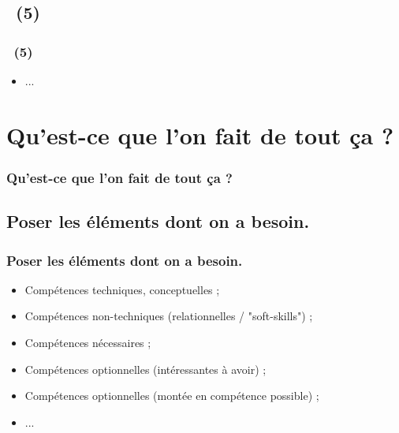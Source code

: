 \documentclass{beamer}
\begin{document}
\subsection{\titleExemplesCyberFizzBuzz ~(5)}
\begin{frame}
	\frametitle{\titleExemplesCyberFizzBuzz ~(5)}
	\begin{itemize}
		\item ...
	\end{itemize}
\end{frame} 

\section{Qu'est-ce que l'on fait de tout \c{c}a ?}
\begin{frame}
	\frametitle{Qu'est-ce que l'on fait de tout \c{c}a ?}
	\tableofcontents[sections=4,currentsection,subsectionstyle=show/shaded/hide] %
\end{frame} 

\subsection{Poser les {\'e}l{\'e}ments dont on a besoin. }
\begin{frame}
	\frametitle{Poser les {\'e}l{\'e}ments dont on a besoin. }
	\begin{itemize}
		\item Comp{\'e}tences techniques, conceptuelles ; 
		\item Comp{\'e}tences non-techniques (relationnelles / "soft-skills") ; 
		\item Comp{\'e}tences n{\'e}cessaires ; 
		\item Comp{\'e}tences optionnelles (int{\'e}ressantes {\`a} avoir) ; 
		\item Comp{\'e}tences optionnelles (mont{\'e}e en comp{\'e}tence possible) ; 
		\item ... 
	\end{itemize}
\end{frame} 
\end{document}
